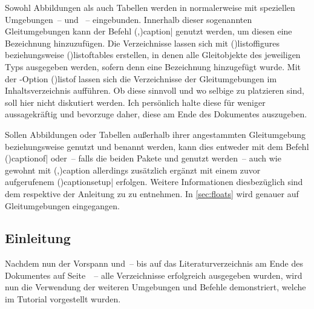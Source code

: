 \documentclass[%
  english,ngerman,%
  cdgeometry=no,DIV=12,%
  cd=false,cdfont=false,cdtitle=true,%
  headings=normal,%
  automark,%
  listof=toc,%
]{tudscrartcl}
\begin{document}
Sowohl Abbildungen als auch Tabellen werden in  normalerweise 
mit speziellen Umgebungen~--  und ~-- 
eingebunden. Innerhalb dieser sogenannten Gleitumgebungen kann der Befehl 
\Macro(,){caption|%
  }
genutzt werden, um diesen eine Bezeichnung hinzuzufügen. Die Verzeichnisse 
lassen sich mit \Macro(){listoffigures} beziehungsweise 
\Macro(){listoftables} erstellen, in denen alle 
Gleitobjekte des jeweiligen Typs ausgegeben werden, sofern denn eine 
Bezeichnung hinzugefügt wurde. Mit der \KOMAScript-Option 
\Option(){listof}
lassen sich die Verzeichnisse der 
Gleitumgebungen im Inhaltsverzeichnis aufführen. Ob diese sinnvoll und wo 
selbige zu platzieren sind, soll hier nicht diskutiert werden. Ich persönlich 
halte diese für weniger aussagekräftig und bevorzuge daher, diese am Ende des 
Dokumentes auszugeben. 

Sollen Abbildungen oder Tabellen außerhalb ihrer angestammten Gleitumgebung 
 beziehungsweise  genutzt und benannt 
werden, kann dies entweder mit dem Befehl 
\Macro(){captionof|%
  }
oder~-- falls die beiden Pakete  und  
genutzt werden~-- auch wie gewohnt mit 
\Macro(,){caption} allerdings zusätzlich 
ergänzt mit einem zuvor aufgerufenem 
\Macro(){captionsetup|} 
erfolgen. Weitere Informationen diesbezüglich sind dem \scrguide respektive der 
Anleitung zu  zu entnehmen. In \autoref{sec:floats} wird 
genauer auf Gleitumgebungen eingegangen.
%
\begin{Trunk}
\tableofcontents
\listoffigures
\listoftables

\end{Trunk}
\begin{Trunk+}
\printacronyms[style=acrotabu]
\printsymbols[style=symblongtabu]

\chapter{Einleitung}

Nachdem nun der Vorspann und~-- bis auf das Literaturverzeichnis am 
Ende des Dokumentes auf Seite~\pageref{sec:bibliography}~-- alle 
Verzeichnisse erfolgreich ausgegeben wurden, wird nun die Verwendung 
der weiteren Umgebungen und Befehle demonstriert, welche im Tutorial 
 vorgestellt wurden.

\end{Trunk+}
\end{document}
